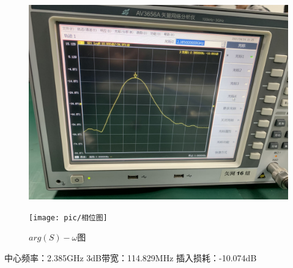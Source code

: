 \documentclass{../source/Experiment}
\begin{document}
        \begin{figure}[H]
            \centering
            \begin{minipage}[t]{0.48\textwidth}
                \centering
                \includegraphics[width=1\textwidth]{pic/滤波特性}
                \caption{$S-w图$}
            \end{minipage}
            \begin{minipage}[t]{0.48\textwidth}
                \centering
                \texttt{[image: pic/相位图]}
                \caption{$arg(S)-\omega 图$}
            \end{minipage}
        \end{figure}

        中心频率：2.385GHz
        3dB带宽：114.829MHz
        插入损耗：-10.074dB
\end{document}
